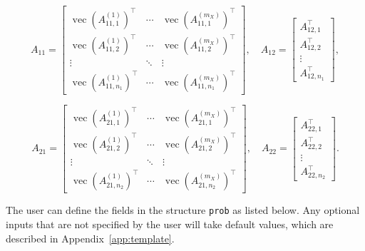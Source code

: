 \documentclass[]{interact}
\newcommand{\vect}{\operatorname{vec}}
\theoremstyle{plain}%
\theoremstyle{definition}
\theoremstyle{remark}
\begin{document}
\begin{equation}\label{eq:A11A12}
A_{11} =
\begin{bmatrix}
\vect\!\left(A_{11,1}^{(1)}\right)^\top & \cdots & \vect\!\left(A_{11,1}^{(m_X)}\right)^\top \\
\vect\!\left(A_{11,2}^{(1)}\right)^\top & \cdots & \vect\!\left(A_{11,2}^{(m_X)}\right)^\top \\
\vdots & \ddots & \vdots \\
\vect\!\left(A_{11,n_1}^{(1)}\right)^\top & \cdots & \vect\!\left(A_{11,n_1}^{(m_X)}\right)^\top
\end{bmatrix},
\quad
A_{12} =
\begin{bmatrix}
A_{12,1}^\top \\
A_{12,2}^\top \\
\vdots \\
A_{12,n_1}^\top
\end{bmatrix},
\end{equation}

\begin{equation}\label{eq:A21A22}
A_{21} =
\begin{bmatrix}
\vect\!\left(A_{21,1}^{(1)}\right)^\top & \cdots & \vect\!\left(A_{21,1}^{(m_X)}\right)^\top \\
\vect\!\left(A_{21,2}^{(1)}\right)^\top & \cdots & \vect\!\left(A_{21,2}^{(m_X)}\right)^\top \\
\vdots & \ddots & \vdots \\
\vect\!\left(A_{21,n_2}^{(1)}\right)^\top & \cdots & \vect\!\left(A_{21,n_2}^{(m_X)}\right)^\top
\end{bmatrix},
\quad
A_{22} =
\begin{bmatrix}
A_{22,1}^\top \\
A_{22,2}^\top \\
\vdots \\
A_{22,n_2}^\top
\end{bmatrix}.
\end{equation}

The user can define the fields in the structure \texttt{prob} as listed below. Any optional inputs that are not specified by the user will take default values, which are described in Appendix~\ref{app:template}.
\end{document}

